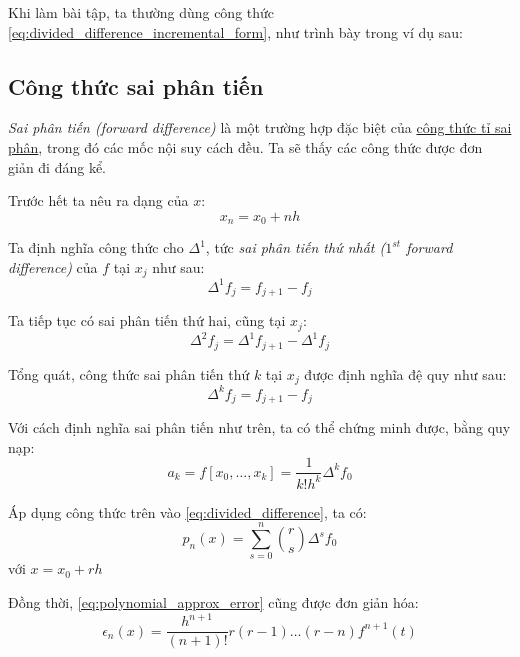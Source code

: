\documentclass[../../Lectures]{subfiles}
\begin{document}
Khi làm bài tập, ta thường dùng công thức
\eqref{eq:divided_difference_incremental_form}, như trình bày trong ví dụ sau:


\subsection{Công thức sai phân tiến}

\emph{Sai phân tiến (forward difference)} là một trường hợp đặc biệt của
\hyperref[eq:divided_difference]{công thức tỉ sai phân}, trong đó các mốc nội
suy cách đều. Ta sẽ thấy các công thức được đơn giản đi đáng kể.

Trước hết ta nêu ra dạng của \(x\):
\[x_n = x_0 + nh\]

Ta định nghĩa công thức cho \(\Delta^1\), tức \emph{sai phân tiến thứ nhất
(\(1^{st}\) forward difference)} của \(f\) tại \(x_j\) như sau:
\[\Delta^1 f_j = f_{j + 1} - f_j\]

Ta tiếp tục có sai phân tiến thứ hai, cũng tại \(x_j\):
\[\Delta^2 f_j = \Delta^1 f_{j + 1} - \Delta^1 f_j\]

Tổng quát, công thức sai phân tiến thứ \(k\) tại \(x_j\) được định nghĩa đệ quy
như sau:
\[\Delta^k f_j = f_{j + 1} - f_j\]

Với cách định nghĩa sai phân tiến như trên, ta có thể chứng minh được, bằng quy
nạp:
\[a_k = f[x_0, \ldots, x_k] = \frac{1}{k! h^k} \Delta^k f_0\]

Áp dụng công thức trên vào \eqref{eq:divided_difference}, ta có:
\[p_n(x) = \sum_{s = 0}^{n} \binom{r}{s} \Delta^s f_0\]
với \(x = x_0 + rh\)

Đồng thời, \eqref{eq:polynomial_approx_error} cũng được đơn giản hóa:
\[\epsilon_n(x) = \frac{h^{n + 1}}{(n + 1)!} r(r - 1) \ldots (r - n) f^{n + 1}(t)\]
\end{document}
